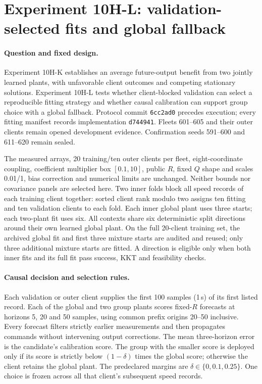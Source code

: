 \section{Experiment 10H-L: validation-selected fits and global fallback}
\label{sec:experiment10hl}

\paragraph{Question and fixed design.}
Experiment 10H-K establishes an average future-output benefit from two jointly
learned plants, with unfavorable client outcomes and competing stationary
solutions. Experiment 10H-L tests whether client-blocked validation can select
a reproducible fitting strategy and whether causal calibration can support
group choice with a global fallback. Protocol commit \texttt{6cc2ad0} precedes
execution; every fitting manifest records implementation \texttt{d744941}.
Fleets 601--605 and their outer clients remain opened development evidence.
Confirmation seeds 591--600 and 611--620 remain sealed.

The measured arrays, 20 training/ten outer clients per fleet, eight-coordinate
coupling, coefficient multiplier box $[0.1,10]$, public $R$, fixed $Q$ shape
and scales 0.01/1, bias correction and numerical limits are unchanged.
Neither bounds nor covariance panels are selected here. Two inner folds
block all speed records of each training client together: sorted client rank
modulo two assigns ten fitting and ten validation clients to each fold.
Each inner global plant uses three starts; each two-plant fit uses six.
All contexts share six deterministic split directions around their own learned
global plant. On the full 20-client training set, the archived global fit and
first three mixture starts are audited and reused; only three additional
mixture starts are fitted. A direction is eligible only when both inner fits
and its full fit pass success, KKT and feasibility checks.

\paragraph{Causal decision and selection rules.}
Each validation or outer client supplies the first 100 samples (1\,s) of its
first listed record. Each of the global and two group plants scores fixed-$R$
forecasts at horizons 5, 20 and 50 samples, using common prefix origins
20--50 inclusive. Every forecast filters strictly earlier measurements and
then propagates commands without intervening output corrections. The mean
three-horizon error is the candidate's calibration score. The group with the
smaller score is deployed only if its score is strictly below
$(1-\delta)$ times the global score; otherwise the client retains the global
plant. The predeclared margins are $\delta\in\{0,0.1,0.25\}$.
One choice is frozen across all that client's subsequent speed records.

